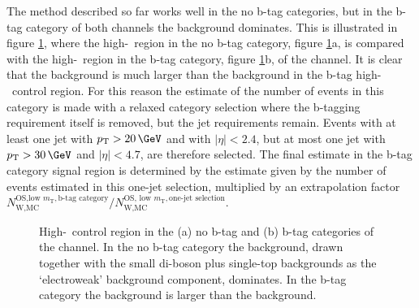 The method described so far works well in the no b-tag categories, but in the b-tag category of both channels
the \ttbar background dominates. This is illustrated in figure \ref{fig:bkgs_highmtctrl}, where
the high-\mT~region in the no b-tag category, figure \ref{fig:bkgs_highmtctrl}a, is compared with the high-\mT~region in the 
b-tag category, figure \ref{fig:bkgs_highmtctrl}b, of the \etau channel. It is clear that the \ttbar 
background is much larger than the \Wjets background in the b-tag high-\mT~control region.
For this reason the estimate of the number
of \Wjets events in this category is made with a relaxed category selection where the b-tagging
requirement itself is removed, but the jet requirements remain. Events with at least one 
jet with $\pTm>20\,\GeV$ and with $|\eta|<2.4$, but at most one jet with $\pTm>30\,\GeV$ and $|\eta|<4.7$, are therefore selected. The final \Wjets estimate in the b-tag category signal
region is determined by the estimate given by the number of \Wjets events
estimated in this one-jet selection, multiplied by an extrapolation factor 
$N_{\text{W,MC}}^{\text{OS,low } m_{\text{T}},\text{b-tag category}}/N_{\text{W,MC}}^{\text{OS, low }m_{\text{T}},\text{one-jet selection}}$.
\begin{figure}[h!]
\begin{center}
\end{center}
\caption[High-\mT~control region in the no b-tag and b-tag
categories of the \etau channel.]{High-\mT~control region in the (a) no b-tag and (b) b-tag categories of the \etau
channel. In the no b-tag category the \Wjets background, drawn together with the small
 di-boson plus single-top backgrounds as the `electroweak' background component, dominates. In the b-tag
category the \ttbar background is larger than the \Wjets background.}
\label{fig:bkgs_highmtctrl}
\end{figure}

